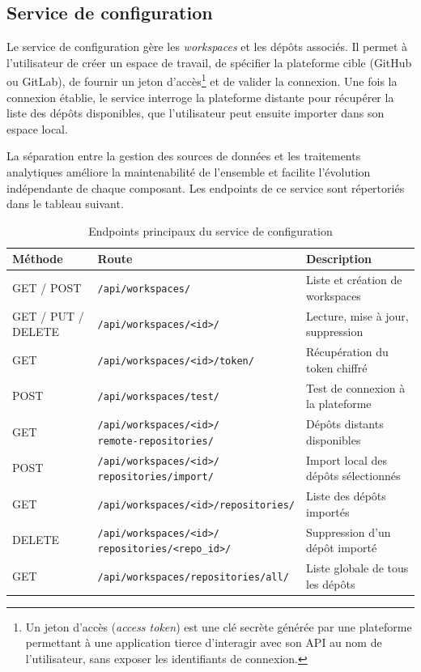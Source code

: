 \subsection{Service de configuration}

Le service de configuration gère les \textit{workspaces} et les dépôts associés. Il permet à
l'utilisateur de créer un espace de travail, de spécifier la plateforme cible (GitHub ou GitLab),
de fournir un jeton d'accès\footnote{Un jeton d'accès (\textit{access token}) est une clé secrète
générée par une plateforme permettant à une application tierce d'interagir avec son API au nom de
l'utilisateur, sans exposer les identifiants de connexion.} et de valider la connexion. Une fois
la connexion établie, le service interroge la plateforme distante pour récupérer la liste des
dépôts disponibles, que l'utilisateur peut ensuite importer dans son espace local.

La séparation entre la gestion des sources de données et les traitements analytiques améliore la
maintenabilité de l'ensemble et facilite l'évolution indépendante de chaque composant. Les
endpoints de ce service sont répertoriés dans le tableau suivant.

\begin{table}[H]
\centering
\small
\caption{Endpoints principaux du service de configuration}
\label{tab:endpoints-config}
\begin{tabular}{|>{\centering\arraybackslash}p{2cm}
                |>{\raggedright\arraybackslash}p{7cm}
                |>{\raggedright\arraybackslash}p{3.5cm}|}
\hline
\textbf{Méthode} & \textbf{Route} & \textbf{Description} \\
\hline
GET / POST & \texttt{/api/workspaces/} & Liste et création de workspaces \\
\hline
GET / PUT / DELETE & \texttt{/api/workspaces/<id>/} & Lecture, mise à jour, suppression \\
\hline
GET & \texttt{/api/workspaces/<id>/token/} & Récupération du token chiffré \\
\hline
POST & \texttt{/api/workspaces/test/} & Test de connexion à la plateforme \\
\hline
GET & \makecell[l]{\texttt{/api/workspaces/<id>/} \\ \texttt{remote-repositories/}} & Dépôts distants disponibles \\
\hline
POST & \makecell[l]{\texttt{/api/workspaces/<id>/} \\ \texttt{repositories/import/}} & Import local des dépôts sélectionnés \\
\hline
GET & \texttt{/api/workspaces/<id>/repositories/} & Liste des dépôts importés \\
\hline
DELETE & \makecell[l]{\texttt{/api/workspaces/<id>/} \\ \texttt{repositories/<repo\_id>/}} & Suppression d'un dépôt importé \\
\hline
GET & \texttt{/api/workspaces/repositories/all/} & Liste globale de tous les dépôts \\
\hline
\end{tabular}
\end{table}

